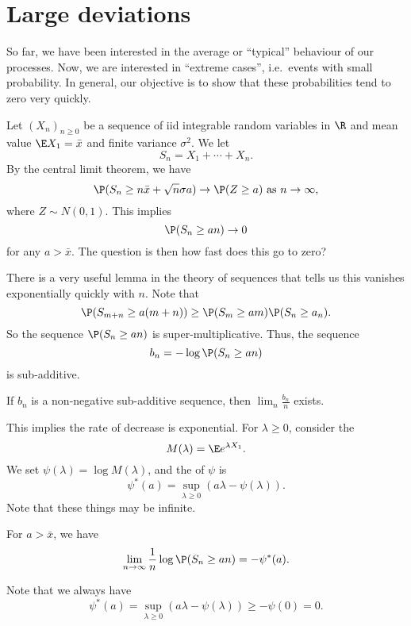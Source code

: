 \documentclass[a4paper]{article}
\begin{document}
\section{Large deviations}
So far, we have been interested in the average or ``typical'' behaviour of our processes. Now, we are interested in ``extreme cases'', i.e.\ events with small probability. In general, our objective is to show that these probabilities tend to zero very quickly.

Let $(X_n)_{n \geq 0}$ be a sequence of iid integrable random variables in $\R$ and mean value $\E X_1 = \bar{x}$ and finite variance $\sigma^2$. We let
\[
  S_n = X_1 + \cdots + X_n.
\]
By the central limit theorem, we have
\[
  \P(S_n \geq n \bar{x} + \sqrt{n} \sigma a) \to \P(Z \geq a)\text{ as }n \to \infty,
\]
where $Z \sim N(0, 1)$. This implies
\[
  \P(S_n \geq an) \to 0
\]
for any $a > \bar{x}$. The question is then how fast does this go to zero?

There is a very useful lemma in the theory of sequences that tells us this vanishes exponentially quickly with $n$. Note that
\[
  \P(S_{m + n} \geq a (m + n))\geq \P(S_m \geq am) \P(S_n \geq a_n).
\]
So the sequence $\P(S_n \geq an)$ is super-multiplicative. Thus, the sequence
\[
  b_n = -\log \P (S_n \geq an)
\]
is sub-additive.

\begin{lemma}[Fekete]
  If $b_n$ is a non-negative sub-additive sequence, then $\lim_n \frac{b_n}{n}$ exists.
\end{lemma}

This implies the rate of decrease is exponential. For $\lambda \geq 0$, consider the 
\[
  M(\lambda) = \E e^{\lambda X_1}.
\]
We set $\psi(\lambda) = \log M(\lambda)$, and the  of $\psi$ is
\[
  \psi^*(a) = \sup_{\lambda \geq 0} (a\lambda - \psi (\lambda)).
\]
Note that these things may be infinite.

\begin{thm}
  For $a > \bar{x}$, we have
  \[
    \lim_{n \to \infty} \frac{1}{n} \log \P(S_n \geq an) = - \psi^*(a).
  \]
\end{thm}
Note that we always have
\[
  \psi^*(a) = \sup_{\lambda \geq 0} (a\lambda - \psi(\lambda)) \geq -\psi(0) = 0.
\]
\end{document}
